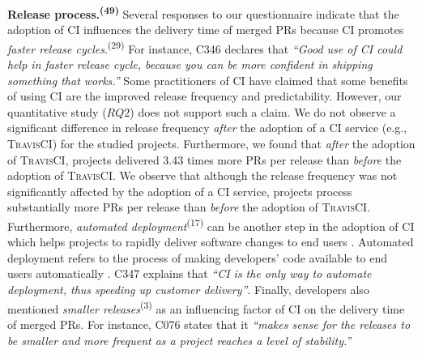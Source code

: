 \vspace{0.6mm}
\noindent\textbf{Release process.\textsuperscript{(49)}} Several responses to our questionnaire indicate that the adoption of CI influences the delivery time of merged PRs because CI promotes \textit{faster release cycles}.\textsuperscript{(29)} For instance, 
C346 declares that \textit{``Good use of CI could help in faster release cycle, because you can be more confident in shipping something that works.''} Some practitioners of CI \citep{goodman2008s} have claimed that some benefits of using CI are the improved release frequency and predictability. However, our quantitative study ($RQ2$) does not support such a claim. We do not observe a significant difference in release frequency \textit{after} the adoption of a CI service (e.g., \textsc{TravisCI}) for the studied projects. Furthermore, we found that \textit{after} the adoption of \textsc{TravisCI}, projects delivered 3.43 times more PRs per release than \textit{before} the adoption of \textsc{TravisCI}. We observe that although the release frequency was not significantly affected by the adoption of a CI service, projects process substantially more PRs per release than \textit{before} the adoption of \textsc{TravisCI}.
Furthermore, \textit{automated deployment}\textsuperscript{(17)} can be another step in the adoption of CI which helps projects to rapidly deliver software changes to end users \citep{Humble2010-ca}. 
Automated deployment refers to the process of making developers' code available to end users automatically \citep{rahman2015synthesizing}.  C347 explains that \textit{``CI is the only way to automate deployment, thus speeding up customer delivery''}.
 Finally, developers also mentioned \textit{smaller releases}\textsuperscript{(3)} as an influencing factor of CI on the delivery time of merged PRs. For instance, C076 states that it \textit{``makes sense for the releases to be smaller and more frequent as a project reaches a level of stability.''} 


